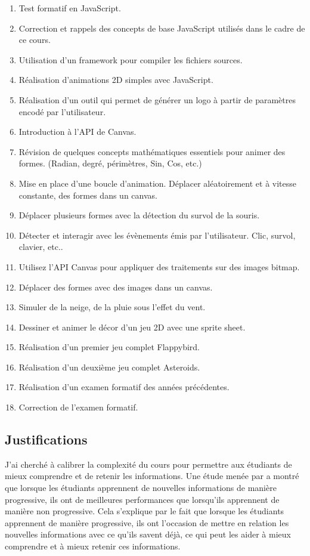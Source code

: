 \begin{enumerate}
    \item Test formatif en JavaScript.
    \item Correction et rappels des concepts de base JavaScript utilisés dans le cadre de ce cours.
    \item Utilisation d’un framework pour compiler les fichiers sources.
    \item Réalisation d'animations 2D simples avec JavaScript.
    \item Réalisation d’un outil qui permet de générer un logo à partir de paramètres encodé par l’utilisateur.
    \item Introduction à l’API de Canvas.
    \item Révision de quelques concepts mathématiques essentiels pour animer des formes. (Radian, degré, périmètres, Sin, Cos, etc.)
    \item Mise en place d’une boucle d’animation. Déplacer aléatoirement et à vitesse constante, des formes dans un canvas.
    \item Déplacer plusieurs formes avec la détection du survol de la souris.
    \item Détecter et interagir avec les évènements émis par l'utilisateur. Clic, survol, clavier, etc..
    \item Utilisez l’API Canvas pour appliquer des traitements sur des images bitmap.
    \item Déplacer des formes avec des images dans un canvas.
    \item Simuler de la neige, de la pluie sous l'effet du vent.
    \item Dessiner et animer le décor d’un jeu 2D avec une sprite sheet.
    \item Réalisation d’un premier jeu complet Flappybird.
    \item Réalisation d’un deuxième jeu complet Asteroids.
    \item Réalisation d’un examen formatif des années précédentes.
    \item Correction de l'examen formatif.
\end{enumerate}

\clearpage
\subsection{Justifications}

J'ai cherché à calibrer la complexité du cours pour permettre aux étudiants de mieux comprendre et de retenir les informations. Une étude menée par \citet{mayer2003nine} a montré que lorsque les étudiants apprennent de nouvelles informations de manière progressive, ils ont de meilleures performances que lorsqu'ils apprennent de manière non progressive. Cela s'explique par le fait que lorsque les étudiants apprennent de manière progressive, ils ont l'occasion de mettre en relation les nouvelles informations avec ce qu'ils savent déjà, ce qui peut les aider à mieux comprendre et à mieux retenir ces informations.

